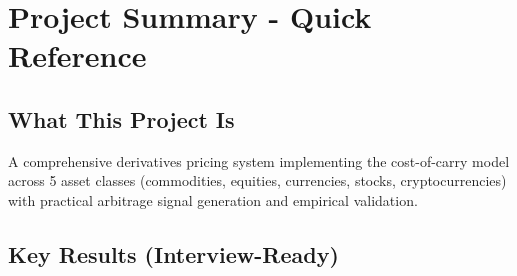 \documentclass[12pt,a4paper]{article}
\begin{document}
\newpage
\section*{Project Summary - Quick Reference}

\subsection*{What This Project Is}

A comprehensive derivatives pricing system implementing the cost-of-carry model across 5 asset classes (commodities, equities, currencies, stocks, cryptocurrencies) with practical arbitrage signal generation and empirical validation.

\subsection*{Key Results (Interview-Ready)}

\vspace{0.4cm}
\end{document}
